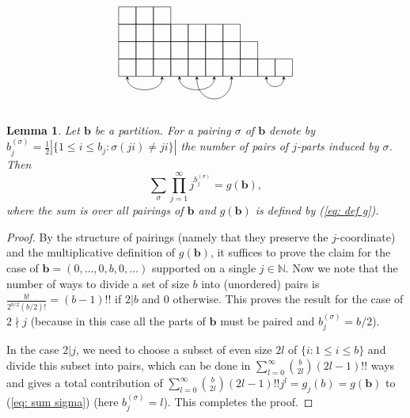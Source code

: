 \documentclass[alphabetic, 
        colorlinks,
        linkcolor=red,  citecolor=blue,
        backref
]{amsart}
\numberwithin{equation}{section}
\newtheorem{lem}[claim]{Lemma}
\theoremstyle{definition}
\newcommand{\N}{{\mathbb N}}
\begin{document}
\[
\begin{tikzpicture}[x=0.55cm,y=0.55cm,>=stealth]

\foreach \c/\height in {
  1/4, 2/4, 3/4,
  4/3, 5/3, 6/3, 7/3,
  8/2,
  9/1, 10/1
}{
  \foreach \r in {1,...,\height}{
    \draw (\c-1,\r-1) rectangle (\c,\r);
  }
}

\draw[<->]
  (0.5,0)
  .. controls (0.5,-1.0) and (2.5,-1.0) ..
  (2.5,0);

\draw[<->]
  (3.5,0)
  .. controls (3.5,-1.0) and (5.5,-1.0) ..
  (5.5,0);

\draw[<->]
  (4.5,0)
  .. controls (4.5,-1.7) and (6.5,-1.7) ..
  (6.5,0);

\draw[<->]
  (8.5,0)
  .. controls (8.5,-0.75) and (9.5,-0.75) ..
  (9.5,0);

\end{tikzpicture}
\]

\begin{lem}\label{prop_number_of_pairings}
Let $\mathbf b$ be a partition. For a pairing $\sigma$ of $\mathbf b$ denote by $b^{(\sigma)}_j=\frac 12|\{1\le i\le b_j:\sigma(ji)\neq ji\}|$ the number of pairs of $j$-parts induced by $\sigma$. Then \begin{equation}\label{eq: sum sigma}\sum_{\sigma}\prod_{j=1}^\infty j^{b^{(\sigma)}_j}=g(\mathbf b),\end{equation}
where the sum is over all pairings of $\mathbf b$ and $g(\mathbf b)$ is defined by (\ref{eq: def g}).
\end{lem}

\begin{proof}
By the structure of pairings (namely that they preserve the $j$-coordinate) and the multiplicative definition of $g(\mathbf b)$, it suffices to prove the claim for the case of $\mathbf b=(0,\ldots,0, b,0,\ldots)$ supported on a single $j\in\N$. Now we note that the number of ways to divide a set of size $b$ into (unordered) pairs is $\frac{b!}{2^{b/2}(b/2)!}=(b-1)!!$ if $2|b$ and 0 otherwise. This proves the result for the case of $2\nmid j$ (because in this case all the parts of $\mathbf b$ must be paired and $b_j^{(\sigma)}=b/2$). 

In the case $2|j$, we need to choose a subset of even size $2l$ of $\{i:1\le i\le b\}$ and divide this subset into pairs, which can be done in $\sum_{l=0}^\infty {b\choose 2l}(2l-1)!!$ ways and gives a total contribution of $\sum_{l=0}^\infty {b\choose 2l}(2l-1)!!j^l=g_j(b)=g(\mathbf b)$ to (\ref{eq: sum sigma}) (here $b_j^{(\sigma)}=l$). This completes the proof.
\end{proof}
\end{document}
